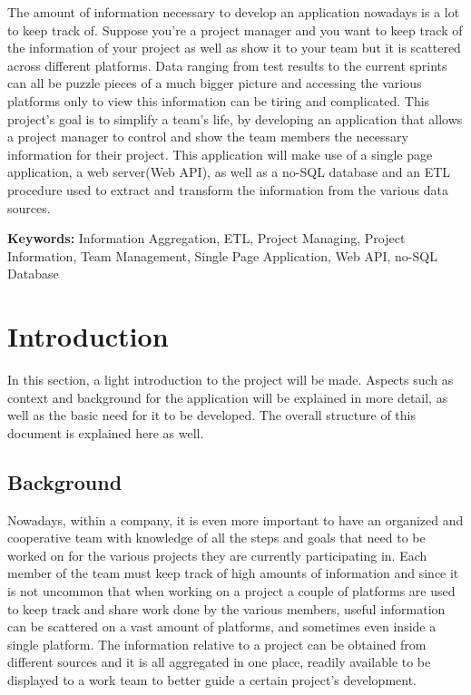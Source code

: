 \documentclass[a4paper,twoside,10pt]{report}
\begin{document}
The amount of information necessary to develop an application nowadays is a lot to keep track of. 
\newline
Suppose you're a project manager and you want to keep track of the information of your project as well as show it to your team but it is scattered across different platforms.
\newline
Data ranging from test results to the current sprints can all be puzzle pieces of a much bigger picture and accessing the various platforms only to view this information can be tiring and complicated.
\newline
This project's goal is to simplify a team's life, by developing an application that allows a project manager to control and show the team members the necessary information for their project.
\newline
This application will make use of a single page application, a web server(Web API), as well as a no-SQL database and an ETL procedure used to extract and transform the information from the various data sources.


\textbf{Keywords:} Information Aggregation, ETL, Project Managing, Project Information, Team Management, Single Page Application, Web API, no-SQL Database


\newpage
\tableofcontents{}
\newpage

\chapter{Introduction}
In this section, a light introduction to the project will be made.
Aspects such as context and background for the application will be explained in more detail, as well as the basic need for it to be developed.
The overall structure of this document is explained here as well.

\section{Background}
Nowadays, within a company, it is even more important to have an organized and cooperative team with knowledge of all the steps and goals that need to be worked on for the various projects they are currently participating in.
Each member of the team must keep track of high amounts of information and since it is not uncommon that when working on a project a couple of platforms are used to keep track and share work done by the various members, useful information can be scattered on a vast amount of platforms, and sometimes even inside a single platform.
The information relative to a project can be obtained from different sources and it is all aggregated in one place, readily available to be displayed to a work team to better guide a certain project's development.
\end{document}
